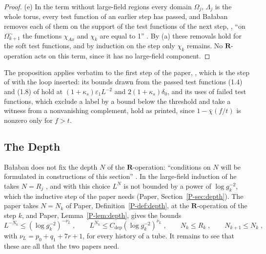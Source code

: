 \documentclass[11pt]{preprint}
\numberwithin{equation}{section}
\theoremstyle{definition}
\theoremstyle{remark}
\theoremstyle{plain}
\begin{document}
\begin{proof}
(e) In the term without large-field regions every domain $\Omega_j$, $\Lambda_j$ is the whole torus, every test function of an earlier step has passed, and Ba{\l}aban removes each of them on the support of the test functions of the next step, \cite[(3.6)--(3.9), pp.~265--266]{BalabanCRE}, ``on $\Omega_{k+1}^{\sim}$ the functions $\chi_{Ax}$ and $\chi_k$ are equal to 1'' \cite[p.~265]{BalabanCRE}. By (a) these removals hold for the soft test functions, and by induction on the step only $\chi_k$ remains. No $\mathbf R$-operation acts on this term, since it has no large-field component.
\end{proof}

The proposition applies verbatim to the first step of the paper, \cite{WilsonFirstStep}, which is the step of \cite[Sect.~1]{BalabanCRE} with the loop inserted: its bounds drawn from the passed test functions (1.4) and (1.8) of \cite{BalabanCRE} hold at $(1 + \kappa_s)\varepsilon_1L^{-2}$ and $2(1 + \kappa_s)\delta_0$, and its uses of failed test functions, which exclude a label by a bound below the threshold and take a witness from a nonvanishing complement, hold as printed, since $1 - \bar\chi(f/t)$ is nonzero only for $f > t$.

\subsection{The Depth}\label{sec:depth}

Ba{\l}aban does not fix the depth $N$ of the $\mathbf R$-operation: ``conditions on $N$ will be formulated in constructions of this section'' \cite[p.~177]{BalabanLFR1}. In the large-field induction of \cite{BalabanLFR2} he takes $N = R_j$ \cite[p.~384]{BalabanLFR2}, and with this choice $L^N$ is not bounded by a power of $\log g_k^{-2}$, which the inductive step of the paper needs (Paper, Section~\ref{P-sec:depth}). The paper takes $N = N_k$ of Paper, Definition~\ref{P-def:depth}, at the $\mathbf R$-operation of the step $k$, and Paper, Lemma~\ref{P-lem:depth}, gives the bounds
\begin{equation}\label{eq:depth-recalled}
    L^{-N_k} \leq (\log g_k^{-2})^{-\nu_L}\;,
    \qquad
    L^{N_k} \leq C_{\mathrm{dep}}(\log g_k^{-2})^{\nu_L}\;,
    \qquad
    N_k \leq R_k\;,
    \qquad
    N_{k+1} \leq N_k\;,
\end{equation}
with $\nu_L = p_0 + q_1 + 7r + 1$, for every history of a tube. It remains to see that these are all that the two papers need.
\end{document}
